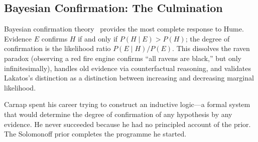 \subsection{Bayesian Confirmation: The Culmination}

Bayesian confirmation theory~\cite{howson2006} provides the most complete response to Hume. Evidence $E$ confirms $H$ if and only if $P(H \mid E) > P(H)$; the degree of confirmation is the likelihood ratio $P(E \mid H) / P(E)$. This dissolves the raven paradox (observing a red fire engine confirms ``all ravens are black,'' but only infinitesimally), handles old evidence via counterfactual reasoning, and validates Lakatos's distinction as a distinction between increasing and decreasing marginal likelihood.

Carnap spent his career trying to construct an inductive logic---a formal system that would determine the degree of confirmation of any hypothesis by any evidence. He never succeeded because he had no principled account of the prior. The Solomonoff prior completes the programme he started.